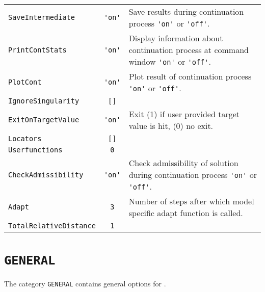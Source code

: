 \begin{tabularx}{\linewidth}{|l|c|X|}
\lstinline+SaveIntermediate+ & \lstinline+'on'+ & Save results during continuation process \lstinline+'on'+ or \lstinline+'off'+.\\ 
\lstinline+PrintContStats+ & \lstinline+'on'+ & Display information about continuation process at command window \lstinline+'on'+ or \lstinline+'off'+.\\ 
\lstinline+PlotCont+ & \lstinline+'on'+ & Plot result of continuation process \lstinline+'on'+ or \lstinline+'off'+.\\ 
\lstinline+IgnoreSingularity+ & \lstinline+[]+ & \\ 
\lstinline+ExitOnTargetValue+ & \lstinline+'on'+ & Exit (1) if user provided target value is hit, (0) no exit.\\ 
\lstinline+Locators+ & \lstinline+[]+ & \\ 
\lstinline+Userfunctions+ & \lstinline+0+ & \\ 
\lstinline+CheckAdmissibility+ & \lstinline+'on'+ & Check admissibility of solution during continuation process \lstinline+'on'+ or \lstinline+'off'+.\\ 
\lstinline+Adapt+ & \lstinline+3+ & Number of steps after which model specific adapt function is called.\\ 
\lstinline+TotalRelativeDistance+ & \lstinline+1+ & \\ 
\hline
\end{tabularx}

\section{\texorpdfstring{\lstinline+GENERAL+}{GENERAL}}
\label{sec:options_opts_general}

The category \lstinline+GENERAL+ contains general options for \OCMAT.


